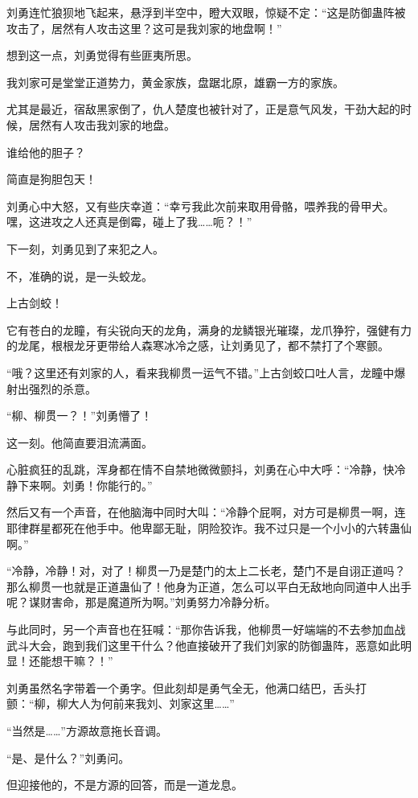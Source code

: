 \begin{this_body}
刘勇连忙狼狈地飞起来，悬浮到半空中，瞪大双眼，惊疑不定：“这是防御蛊阵被攻击了，居然有人攻击这里？这可是我刘家的地盘啊！”

想到这一点，刘勇觉得有些匪夷所思。

我刘家可是堂堂正道势力，黄金家族，盘踞北原，雄霸一方的家族。

尤其是最近，宿敌黑家倒了，仇人楚度也被针对了，正是意气风发，干劲大起的时候，居然有人攻击我刘家的地盘。

谁给他的胆子？

简直是狗胆包天！

刘勇心中大怒，又有些庆幸道：“幸亏我此次前来取用骨骼，喂养我的骨甲犬。嘿，这进攻之人还真是倒霉，碰上了我……呃？！”

下一刻，刘勇见到了来犯之人。

不，准确的说，是一头蛟龙。

上古剑蛟！

它有苍白的龙瞳，有尖锐向天的龙角，满身的龙鳞银光璀璨，龙爪狰狞，强健有力的龙尾，根根龙牙更带给人森寒冰冷之感，让刘勇见了，都不禁打了个寒颤。

“哦？这里还有刘家的人，看来我柳贯一运气不错。”上古剑蛟口吐人言，龙瞳中爆射出强烈的杀意。

“柳、柳贯一？！”刘勇懵了！

这一刻。他简直要泪流满面。

心脏疯狂的乱跳，浑身都在情不自禁地微微颤抖，刘勇在心中大呼：“冷静，快冷静下来啊。刘勇！你能行的。”

然后又有一个声音，在他脑海中同时大叫：“冷静个屁啊，对方可是柳贯一啊，连耶律群星都死在他手中。他卑鄙无耻，阴险狡诈。我不过只是一个小小的六转蛊仙啊。”

“冷静，冷静！对，对了！柳贯一乃是楚门的太上二长老，楚门不是自诩正道吗？那么柳贯一也就是正道蛊仙了！他身为正道，怎么可以平白无敌地向同道中人出手呢？谋财害命，那是魔道所为啊。”刘勇努力冷静分析。

与此同时，另一个声音也在狂喊：“那你告诉我，他柳贯一好端端的不去参加血战武斗大会，跑到我们这里干什么？他直接破开了我们刘家的防御蛊阵，恶意如此明显！还能想干嘛？！”

刘勇虽然名字带着一个勇字。但此刻却是勇气全无，他满口结巴，舌头打颤：“柳，柳大人为何前来我刘、刘家这里……”

“当然是……”方源故意拖长音调。

“是、是什么？”刘勇问。

但迎接他的，不是方源的回答，而是一道龙息。


\end{this_body}
